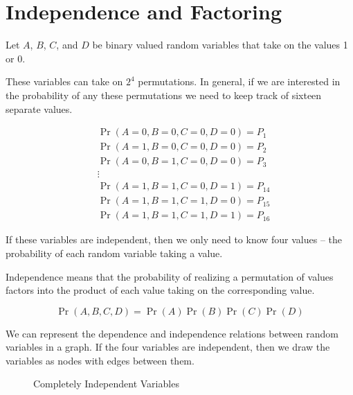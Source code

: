 \documentclass{article}
\begin{document}
\section*{Independence and Factoring}
Let $A$, $B$, $C$, and $D$ be binary valued random variables that take
on the values 1 or 0.

These variables can take on $2^4$ permutations. In general, if we are
interested in the probability of any these permutations we need to
keep track of sixteen separate values.

\begin{align*}
&\Pr(A=0,B=0,C=0,D=0) = P_1 \\
&\Pr(A=1,B=0,C=0,D=0) = P_2 \\
&\Pr(A=0,B=1,C=0,D=0) = P_3 \\
&\vdots \\
&\Pr(A=1,B=1,C=0,D=1) = P_{14} \\
&\Pr(A=1,B=1,C=1,D=0) = P_{15} \\
&\Pr(A=1,B=1,C=1,D=1) = P_{16} 
\end{align*}

If these variables are independent, then we only need to know four
values -- the probability of each random variable taking a value. 

Independence means that the probability of realizing a permutation of
values factors into the product of each value taking on the
corresponding value.

\begin{equation}
\Pr(A,B,C,D) = \Pr(A)\Pr(B)\Pr(C)\Pr(D)
\end{equation}

We can represent the dependence and independence relations between random
variables in a graph. If the four variables are independent, then we draw
the variables as nodes with edges between them.


\begin{figure}[!ht]
\centering
{}
\caption{Completely Independent Variables}
\end{figure}
\end{document}
